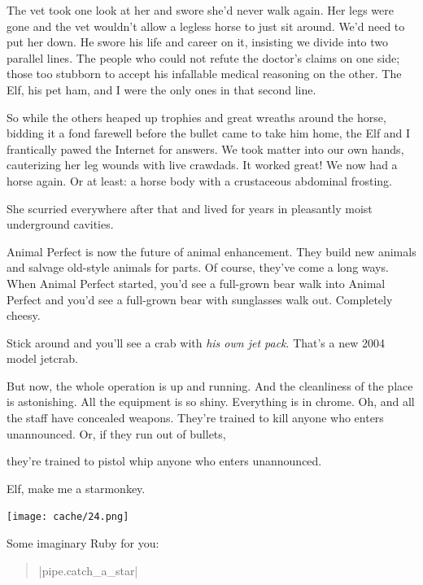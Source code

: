 \documentclass[12pt,twoside]{report}
\begin{document}
The vet took one look at her and swore she'd never walk again.  Her
legs were gone and the vet wouldn't allow a legless horse to just sit
around.  We'd need to put her down.  He swore his life and career on
it, insisting we divide into two parallel lines. The people who could
not refute the doctor's claims on one side; those too stubborn to
accept his infallable medical reasoning on the other.  The Elf, his
pet ham, and I were the only ones in that second line.

So while the others heaped up trophies and great wreaths around the
horse, bidding it a fond farewell before the bullet came to take him
home, the Elf and I frantically pawed the Internet for answers.  We
took matter into our own hands, cauterizing her leg wounds with live
crawdads.  It worked great!  We now had a horse again.  Or at least: a
horse body with a crustaceous abdominal frosting.

She scurried everywhere after that and lived for years in pleasantly
moist underground cavities.

Animal Perfect is now the future of animal enhancement.  They build
new animals and salvage old-style animals for parts.  Of course,
they've come a long ways. When Animal Perfect started, you'd see a
full-grown bear walk into Animal Perfect and you'd see a full-grown
bear with sunglasses walk out.  Completely cheesy.

Stick around and you'll see a crab with {\em his own jet pack}.
That's a new 2004 model jetcrab.


But now, the whole operation is up and running.  And the cleanliness
of the place is astonishing. All the equipment is so shiny.
Everything is in chrome.  Oh, and all the staff have concealed
weapons.  They're trained to kill anyone who enters unannounced.  Or,
if they run out of bullets,

\pagebreak 

they're trained to pistol whip anyone who
enters unannounced.


Elf, make me a starmonkey.

\begin{center}
	\texttt{[image: cache/24.png]}
\end{center}

Some imaginary Ruby for you:

\begin{quote}
\rubyinline|pipe.catch_a_star|\end{quote}
\end{document}
